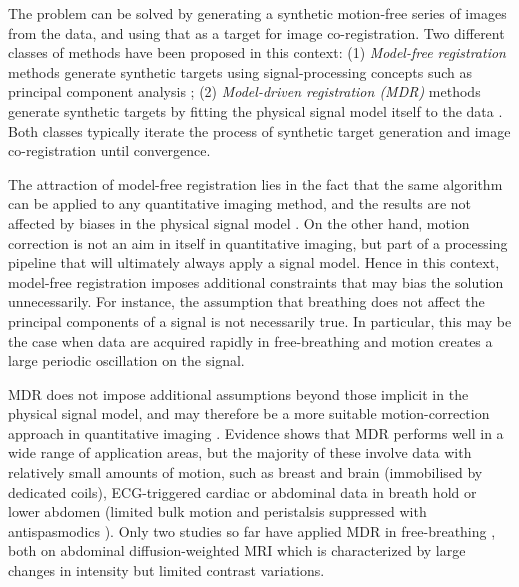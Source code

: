 \documentclass[num-refs]{wiley-article}
\begin{document}
The problem can be solved by generating a synthetic motion-free series of images from the data, and using that as a target for image co-registration. Two different classes of methods have been proposed in this context: (1) {\it Model-free registration} methods generate synthetic targets using signal-processing concepts such as principal component analysis \cite{Melbourne2007, Milles2008, Wollny2012, Hamy2014, Feng2016, Huizinga2016, Zhang2018, CollFont2020}; (2) {\it Model-driven registration (MDR)} methods generate synthetic targets by fitting the physical signal model itself to the data \cite{Hayton1997}. Both classes typically iterate the process of synthetic target generation and image co-registration until convergence.

The attraction of model-free registration lies in the fact that the same algorithm can be applied to any quantitative imaging method, and the results are not affected by biases in the physical signal model \cite{Schnabel2016}. On the other hand, motion correction is not an aim in itself in quantitative imaging, but part of a processing pipeline that will ultimately always apply a signal model. Hence in this context, model-free registration imposes additional constraints that may bias the solution unnecessarily. For instance, the assumption that breathing does not affect the principal components of a signal is not necessarily true. In particular, this may be the case when data are acquired rapidly in free-breathing and motion creates a large periodic oscillation on the signal. 

MDR does not impose additional assumptions beyond those implicit in the physical signal model, and may therefore be a more suitable motion-correction approach in quantitative imaging \cite{Flouri2020}. Evidence shows that MDR performs well in a wide range of application areas, but the majority of these involve data with relatively small amounts of motion, such as breast \cite{Hayton1997} and brain \cite{Mirzaalian2012, Jiao2014, Ramos-Llorden2017} (immobilised by dedicated coils), ECG-triggered cardiac or abdominal data in breath hold \cite{Adluru2006, Buonaccorsi2006, Buonaccorsi2007, Xue2012, VanDeGiessen2013, Likhite2015, Tilborghs2019} or lower abdomen \cite{Bhushan2011, Enescu2014, Hallack2014} (limited bulk motion and peristalsis suppressed with antispasmodics \cite{Jhaveri2015}). Only two studies so far have applied MDR in free-breathing \cite{Kurugol2017, Flouri2020}, both on abdominal diffusion-weighted MRI which is characterized by large changes in intensity but limited contrast variations. 
\end{document}

